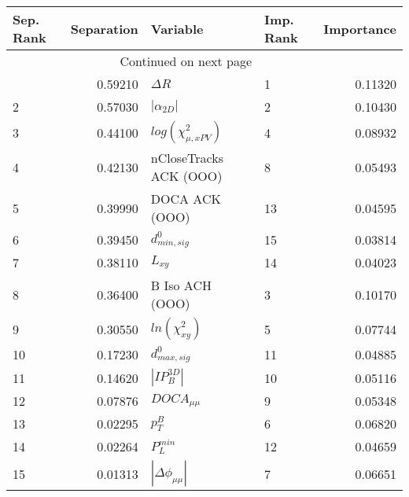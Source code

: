 \usepackage{lscape}

\begin{landscape}
\begin{longtable}{lrllr}
\toprule
Sep. Rank &  Separation &                   Variable & Imp. Rank &  Importance \\
\midrule
\endhead
\midrule
\multicolumn{3}{r}{{Continued on next page}} \\
\midrule
\endfoot

\bottomrule
\endlastfoot
        1 &     0.59210 &                 $\Delta R$ &         1 &     0.11320 \\
        2 &     0.57030 &            $|\alpha_{2D}|$ &         2 &     0.10430 \\
        3 &     0.44100 &  $log(\chi^{2}_{\mu,xPV})$ &         4 &     0.08932 \\
        4 &     0.42130 &     nCloseTracks ACK (OOO) &         8 &     0.05493 \\
        5 &     0.39990 &             DOCA ACK (OOO) &        13 &     0.04595 \\
        6 &     0.39450 &           $d^0_{min, sig}$ &        15 &     0.03814 \\
        7 &     0.38110 &                   $L_{xy}$ &        14 &     0.04023 \\
        8 &     0.36400 &            B Iso ACH (OOO) &         3 &     0.10170 \\
        9 &     0.30550 &        $ln(\chi^{2}_{xy})$ &         5 &     0.07744 \\
       10 &     0.17230 &           $d^0_{max, sig}$ &        11 &     0.04885 \\
       11 &     0.14620 &            $|IP_{B}^{3D}|$ &        10 &     0.05116 \\
       12 &     0.07876 &            $DOCA_{\mu\mu}$ &         9 &     0.05348 \\
       13 &     0.02295 &                  $p^B_{T}$ &         6 &     0.06820 \\
       14 &     0.02264 &              $P^{min}_{L}$ &        12 &     0.04659 \\
       15 &     0.01313 &   $|\Delta \phi_{\mu\mu}|$ &         7 &     0.06651 \\
\end{longtable}

\end{landscape}
